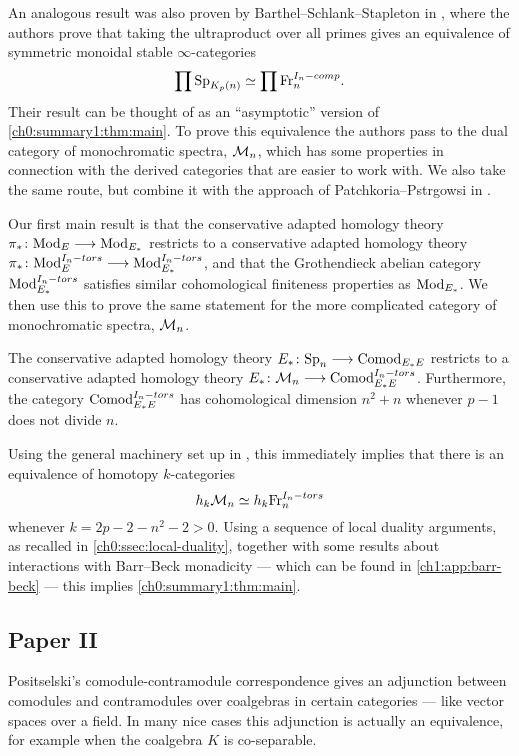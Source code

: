 An analogous result was also proven by Barthel--Schlank--Stapleton in \cite{barthel-schlank-stapleton_2021}, where the authors prove that taking the ultraproduct over all primes gives an equivalence of symmetric monoidal stable $\infty$-categories 
\[\prod \mathrm{Sp}_{K_p(n)} \simeq \prod \mathrm{Fr}_{n}^{I_n-comp}.\]
Their result can be thought of as an ``asymptotic'' version of \cref{ch0:summary1:thm:main}. To prove this equivalence the authors pass to the dual category of monochromatic spectra, $\mathcal{M}_{n}$, which has some properties in connection with the derived categories that are easier to work with. We also take the same route, but combine it with the approach of Patchkoria--Pstr\a{}gowsi in \cite{patchkoria-pstragowski_2021}. 

Our first main result is that the conservative adapted homology theory $\pi_* \colon \mathrm{Mod}_{E} \longrightarrow \mathrm{Mod}_{E_*}$ restricts to a conservative adapted homology theory $\pi_* \colon \mathrm{Mod}_{E}^{I_n-tors}\longrightarrow \mathrm{Mod}_{E_*}^{I_n-tors}$, and that the Grothendieck abelian category $\mathrm{Mod}_{E_*}^{I_n-tors}$ satisfies similar cohomological finiteness properties as $\mathrm{Mod}_{E_*}$. We then use this to prove the same statement for the more complicated category of monochromatic spectra, $\mathcal{M}_{n}$. 

\begin{theorem}
    The conservative adapted homology theory $E_*\colon \mathrm{Sp}_{n}\longrightarrow \mathrm{Comod}_{E_*E}$ restricts to a conservative adapted homology theory $E_*\colon \mathcal{M}_{n}\longrightarrow \mathrm{Comod}_{E_*E}^{I_n-tors}$. Furthermore, the category $\mathrm{Comod}_{E_*E}^{I_n-tors}$ has cohomological dimension $n^2+n$ whenever $p-1$ does not divide $n$. 
\end{theorem}

Using the general machinery set up in \cite{patchkoria-pstragowski_2021}, this immediately implies that there is an equivalence of homotopy $k$-categories
\[h_k \mathcal{M}_{n} \simeq h_k\mathrm{Fr}_{n}^{I_n-tors}\]
whenever $k= 2p-2-n^2-2>0$. Using a sequence of local duality arguments, as recalled in \cref{ch0:ssec:local-duality}, together with some results about interactions with Barr--Beck monadicity --- which can be found in \cref{ch1:app:barr-beck} --- this implies \cref{ch0:summary1:thm:main}. 




\subsection{Paper II}

Positselski's comodule-contramodule correspondence gives an adjunction between comodules and contramodules over coalgebras in certain categories --- like vector spaces over a field. In many nice cases this adjunction is actually an equivalence, for example when the coalgebra $K$ is co-separable. 

